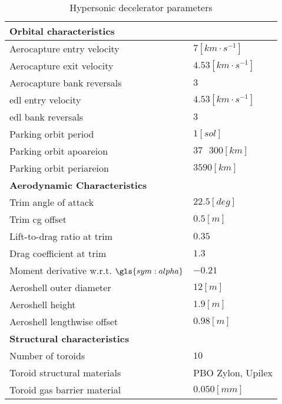 \begin{table}[H]
	\centering
	\caption{Hypersonic decelerator parameters}
	\label{tab:DeceleratorPar}
	\begin{tabular}{|p{}|p{}|} \hline
		\textbf{Orbital characteristics}             	& 			\\ \hline \hline
		Aerocapture entry velocity       				&	 $7 \left[km \cdot s^{-1}\right]$ 		\\ \hline
		Aerocapture exit velocity				 		&    $4.53 \left[km \cdot s^{-1}\right]$  	  	\\ \hline
		Aerocapture bank reversals				        &  	 $3$		\\ \hline
		\gls{edl} entry velocity					 	&  	 $4.53 \left[km \cdot s^{-1}\right]$	\\ \hline
		\gls{edl} bank reversals					 	&  	 $3$	\\ \hline
		Parking orbit period						 	&  	 $1 \left[sol\right]$		\\ \hline
		Parking orbit apoareion			 				&  	$37\mbox{ }300 \left[km\right]$		\\ \hline
		Parking orbit periareion			 			&  	$3590 \left[km\right]$		\\ \hline
		\textbf{Aerodynamic Characteristics}			&			\\ \hline \hline
		Trim angle of attack				 			&  $22.5 \left[deg\right]$			\\ \hline
		Trim \gls{cg} offset							&  $0.5 \left[m\right]$		\\ \hline
		Lift-to-drag ratio at trim			 			&  	$0.35$	\\ \hline
		Drag coefficient at trim			 			&  	$1.3$	\\ \hline
		Moment derivative w.r.t. $\gls{sym:alpha}$		&  	$-0.21$		\\ \hline
		Aeroshell outer diameter						&  	$12 \left[m\right]$		\\ \hline
		Aeroshell height								&  	$1.9 \left[m\right]$		\\ \hline
		Aeroshell lengthwise offset						&  	$0.98 \left[m\right]$		\\ \hline
		\textbf{Structural characteristics}				&			\\ \hline \hline
		Number of toroids					 			&   $10$			\\ \hline 
		Toroid structural materials						 			&  	PBO Zylon\textsuperscript{\textregistered}, Upilex		\\ \hline
		Toroid gas barrier material		&	$0.050 \left[mm\right]$		\\ \hline

\end{tabular}
\end{table}

